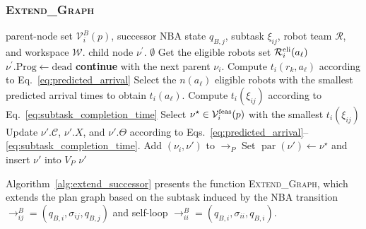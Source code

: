 \documentclass[lettersize,journal]{IEEEtran}
\theoremstyle{italiclemma}
\theoremstyle{italiclemma}
\theoremstyle{definition}
\begin{document}
\subsubsection{\textsc{Extend\_Graph}} \label{gen}
\begin{algorithm}[!t]
\caption{\textsc{Extend\_Graph}}
\label{alg:extend_successor}
\begin{algorithmic}[1]
\REQUIRE parent-node set $\mathcal V_i^B(p)$, successor NBA state $q_{B,j}$, subtask $\xi_{ij}$, robot team $\mathcal R$, and workspace $\mathcal W$.
\ENSURE child node $\nu^{'}$.
    \RETURN $\emptyset$
\ENDIF
{}
        \STATE Get the eligible robots set $\mathcal R_i^{\rm eli}(a_\ell)$
            \STATE $\nu^{'}.\mathrm{Prog}\gets\mathrm{dead}$
            \STATE \textbf{continue} with the next parent $\nu_i$.
        \ENDIF
        \STATE Compute $t_i(r_k,a_\ell)$  according to
        Eq.~\eqref{eq:predicted_arrival}
        \STATE Select the $n(a_\ell)$ eligible robots with the smallest predicted arrival times to obtain $t_i(a_\ell)$.
    \ENDFOR
    \STATE Compute $t_i(\xi_{ij})$ according to
        Eq.~\eqref{eq:subtask_completion_time}
\ENDFOR
    \STATE Select $\nu^\star\in\mathcal V_i^{\rm feas}(p)$ with the smallest $t_i(\xi_{ij})$
    \STATE Update $\nu'.\mathcal C$, $\nu'.X$, and $\nu'.\Theta$ according to Eqs.~\eqref{eq:predicted_arrival}--\eqref{eq:subtask_completion_time}.
    \STATE Add $(\nu_i,\nu')$ to $\rightarrow_P$
    \ENDFOR
    \STATE Set $\operatorname{par}(\nu')\gets\nu^\star$
and insert $\nu'$ into $V_P$
    \RETURN $\nu'$
\end{algorithmic}
\end{algorithm}
Algorithm~\ref{alg:extend_successor} presents the function \textsc{Extend\_Graph}, which extends the plan graph based on the subtask induced by the NBA transition $\rightarrow^B_{ij}=(q_{B,i},\sigma_{ij},q_{B,j})$ and self-loop $\rightarrow^B_{ii}=(q_{B,i},\sigma_{ii},q_{B,i})$.
\end{document}
